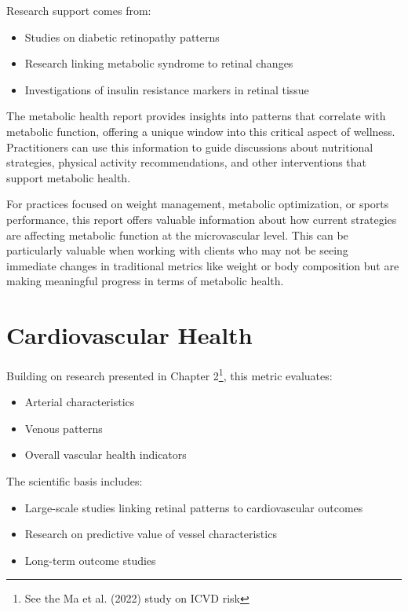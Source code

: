 \documentclass[
  Letterpaper,
]{scrbook}
\providecommand{\tightlist}{%
  \setlength{\itemsep}{0pt}\setlength{\parskip}{0pt}}\usepackage{longtable,booktabs,array}
\begin{document}
Research support comes from:

\begin{itemize}
\tightlist
\item
  Studies on diabetic retinopathy patterns
\item
  Research linking metabolic syndrome to retinal changes
\item
  Investigations of insulin resistance markers in retinal tissue
\end{itemize}

The metabolic health report provides insights into patterns that
correlate with metabolic function, offering a unique window into this
critical aspect of wellness. Practitioners can use this information to
guide discussions about nutritional strategies, physical activity
recommendations, and other interventions that support metabolic health.

For practices focused on weight management, metabolic optimization, or
sports performance, this report offers valuable information about how
current strategies are affecting metabolic function at the microvascular
level. This can be particularly valuable when working with clients who
may not be seeing immediate changes in traditional metrics like weight
or body composition but are making meaningful progress in terms of
metabolic health.

\section{Cardiovascular Health}\label{cardiovascular-health}

Building on research presented in Chapter 2\footnote{See the Ma et al.
  (2022) study on ICVD risk}, this metric evaluates:

\begin{itemize}
\tightlist
\item
  Arterial characteristics
\item
  Venous patterns
\item
  Overall vascular health indicators
\end{itemize}

The scientific basis includes:

\begin{itemize}
\tightlist
\item
  Large-scale studies linking retinal patterns to cardiovascular
  outcomes
\item
  Research on predictive value of vessel characteristics
\item
  Long-term outcome studies
\end{itemize}
\end{document}
